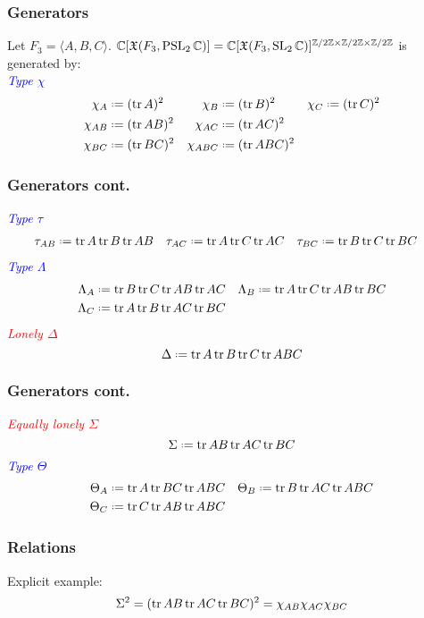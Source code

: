 \begin{frame}
\frametitle{Generators}
Let $F_3=\langle A,B,C\rangle$.
$\mathbb{C}[\mathfrak{X}(F_3,\operatorname{PSL}_2\mathbb{C})]=\mathbb{C}[\mathfrak{X}(F_3,\operatorname{SL}_2\mathbb{C})]
^{\mathbb{Z}/2\mathbb{Z}\times\mathbb{Z}/2\mathbb{Z}\times\mathbb{Z}/2\mathbb{Z}}$ is
generated by:\\
\vspace{3mm} \textcolor{blue}{\emph{Type $\chi$}}
\begin{align*}
  \chi_A&\coloneq(\tr A)^2&\chi_B&\coloneq(\tr B)^2&\chi_C&\coloneq(\tr C)^2\\
  \chi_{AB}&\coloneq(\tr AB)^2&\chi_{AC}&\coloneq(\tr AC)^2 \\
  \chi_{BC}&\coloneq(\tr BC)^2&\chi_{ABC}&\coloneq(\tr ABC)^2
\end{align*}
\end{frame}

\begin{frame}
\frametitle{Generators cont.}
\textcolor{blue}{\emph{Type $\tau$}}
\begin{align*}
  \tau_{AB}&\coloneq\tr A\tr B\tr AB &\tau_{AC}&\coloneq\tr A\tr C\tr AC &\tau_{BC}&\coloneq\tr B\tr C\tr BC
\end{align*}
\pause
\textcolor{blue}{\emph{Type $\Lambda$}}
\begin{align*}
  \Lambda_A&\coloneq\tr B\tr C\tr AB\tr AC
  &\Lambda_B&\coloneq\tr A\tr C\tr AB\tr BC\\
  \Lambda_C&\coloneq\tr A\tr B\tr AC\tr BC
\end{align*}
\pause
\textcolor{red}{\emph{Lonely $\Delta$}}
\[
\Delta\coloneq \tr A\tr B\tr C\tr ABC
\]
\end{frame}

\begin{frame}
\frametitle{Generators cont.}
\textcolor{red}{\emph{Equally lonely $\Sigma$}}
\[
\Sigma\coloneq \tr AB\tr AC\tr BC
\]
\pause
\textcolor{blue}{\emph{Type $\Theta$}}
\begin{align*}
\Theta_A&\coloneq\tr A\tr BC\tr ABC&\Theta_B&\coloneq\tr B\tr AC\tr ABC \\
\Theta_C&\coloneq\tr C\tr AB\tr ABC
\end{align*}
\end{frame}

\begin{frame}
\frametitle{Relations}
Explicit example:
\[
\Sigma ^2=(\operatorname{tr} AB\operatorname{tr} AC\operatorname{tr} BC)^2=\chi_{AB}\chi_{AC}\chi_{BC}
\]
\end{frame}

